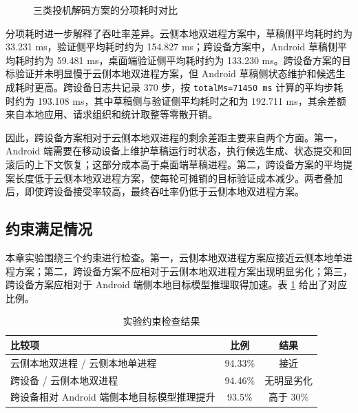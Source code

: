 \begin{figure}[htbp]
  \centering
  \caption{三类投机解码方案的分项耗时对比}
  \label{fig:timing-compare}
\end{figure}

分项耗时进一步解释了吞吐率差异。云侧本地双进程方案中，草稿侧平均耗时约为 33.231 ms，验证侧平均耗时约为 154.827 ms；跨设备方案中，Android 草稿侧平均耗时约为 59.481 ms，桌面端验证侧平均耗时约为 133.230 ms。跨设备方案的目标验证并未明显慢于云侧本地双进程方案，但 Android 草稿侧状态维护和候选生成耗时更高。跨设备日志共记录 370 步，按 \texttt{totalMs=71450 ms} 计算的平均步耗时约为 193.108 ms，其中草稿侧与验证侧平均耗时之和为 192.711 ms，其余差额来自本地应用、请求组织和统计取整等零散开销。

因此，跨设备方案相对于云侧本地双进程的剩余差距主要来自两个方面。第一，Android 端需要在移动设备上维护草稿运行时状态，执行候选生成、状态提交和回滚后的上下文恢复；这部分成本高于桌面端草稿进程。第二，跨设备方案的平均提案长度低于云侧本地双进程方案，使每轮可摊销的目标验证成本减少。两者叠加后，即使跨设备接受率较高，最终吞吐率仍低于云侧本地双进程方案。

\subsection{约束满足情况}

本章实验围绕三个约束进行检查。第一，云侧本地双进程方案应接近云侧本地单进程方案；第二，跨设备方案不应相对于云侧本地双进程方案出现明显劣化；第三，跨设备方案应相对于 Android 端侧本地目标模型推理取得加速。表 \ref{tab:constraints} 给出了对应比例。

\begin{table}[htbp]
  \centering
  \caption{实验约束检查结果}
  \label{tab:constraints}
  \small
  \begin{tabularx}{0.92\textwidth}{Xcc}
    \toprule
    比较项 & 比例 & 结果 \\
    \midrule
    云侧本地双进程 / 云侧本地单进程 & 94.33\% & 接近 \\
    跨设备 / 云侧本地双进程 & 94.46\% & 无明显劣化 \\
    跨设备相对 Android 端侧本地目标模型推理提升 & 93.5\% & 高于 30\% \\
    \bottomrule
  \end{tabularx}
\end{table}

